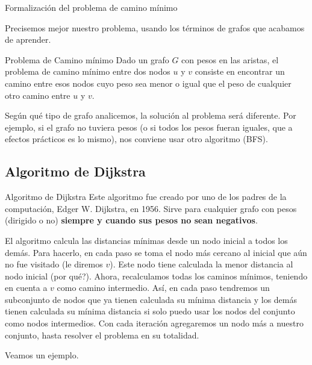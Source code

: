 \documentclass[compress]{beamer}
\begin{document}
\begin{frame}{Formalización del problema de camino mínimo}

Precisemos mejor nuestro problema, usando los términos de grafos que
acabamos de aprender.

\begin{block}{Problema de Camino m\'inimo}
Dado un grafo $G$ con pesos en las aristas, el problema de
camino mínimo entre dos nodos $u$ y $v$ consiste en encontrar un camino
entre esos nodos cuyo peso sea menor o igual que el peso de cualquier
otro camino entre $u$ y $v$.
\end{block}

\bigskip

Según qué tipo de grafo analicemos, la solución al problema será diferente.
Por ejemplo, si el grafo no tuviera pesos (o si todos los pesos fueran iguales,
que a efectos prácticos es lo mismo), nos conviene usar otro algoritmo (BFS).

\end{frame}

\subsection{Algoritmo de Dijkstra}
\begin{frame}{Algoritmo de Dijkstra}
Este algoritmo fue creado por uno de los padres de la computación,
Edger W. Dijkstra, en 1956. Sirve para cualquier grafo con pesos (dirigido
o no) \textbf{siempre y cuando sus pesos no sean negativos}.

\bigskip

El algoritmo calcula las distancias mínimas desde un nodo inicial a todos 
los demás. Para hacerlo, en cada paso se toma el nodo más cercano al inicial
que aún no fue visitado (le diremos $v$). Este nodo tiene calculada la menor distancia
al nodo inicial (\textquestiondown por qué?). Ahora, recalculamos todas
los caminos mínimos, teniendo en cuenta a $v$ como camino intermedio.
Así, en cada paso tendremos un subconjunto de nodos que ya tienen calculada
su mínima distancia y los demás tienen calculada su mínima distancia si solo
puedo usar los nodos del conjunto como nodos intermedios. Con cada
iteración agregaremos un nodo más a nuestro conjunto, hasta resolver el 
problema en su totalidad.

\bigskip

Veamos un ejemplo.
\end{frame}
\end{document}
